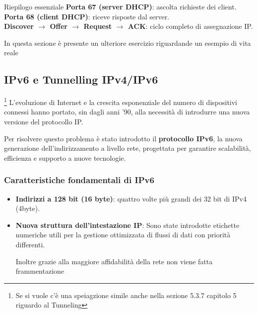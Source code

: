 \documentclass[a4paper,12pt]{report}
\begin{document}
\begin{notebox}{Riepilogo essenziale}
\textbf{Porta 67 (server DHCP)}: ascolta richieste dei client. \\
\textbf{Porta 68 (client DHCP)}: riceve risposte dal server. \\
\textbf{Discover $\rightarrow$ Offer $\rightarrow$ Request $\rightarrow$ ACK}: ciclo completo di assegnazione IP.
\end{notebox}

\begin{collegamentobox}[title=�� ESEMPIO:  (Cap. 5) sezione 5.3.5 DHCP]
    In questa sezione è presente un ulteriore esercizio riguardande un esempio di vita reale
\end{collegamentobox}
\newpage
\subsection{IPv6 e Tunnelling IPv4/IPv6}
\footnote{Se si vuole c'è una speiagzione simile anche nella sezione  5.3.7 capitolo 5 riguardo al Tunneling}
L’evoluzione di Internet e la crescita esponenziale del numero di dispositivi connessi hanno portato,
sin dagli anni ’90, alla necessità di introdurre una nuova versione del protocollo IP.


Per risolvere questo problema è stato introdotto il \textbf{protocollo IPv6}, la nuova generazione
dell’indirizzamento a livello rete, progettata per garantire scalabilità, efficienza e supporto a nuove
tecnologie.

\subsubsection*{Caratteristiche fondamentali di IPv6}

\begin{itemize}
    \item \textbf{Indirizzi a 128 bit (16 byte)}: quattro volte più grandi dei 32 bit di IPv4 (4byte).  
    \item \textbf{Nuova struttura dell’intestazione IP}:  
          Sono state introdotte etichette numeriche utili per la gestione ottimizzata di flussi di dati con priorità differenti.

          Inoltre grazie alla maggiore affidabilità della rete non viene fatta frammentazione
\end{itemize}
\end{document}
